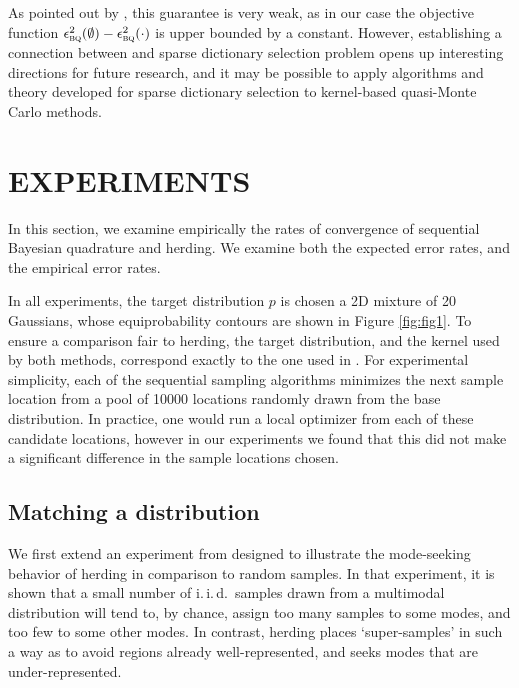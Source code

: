 \documentclass[]{article}
\begin{document}
As pointed out by \citet{KrauseCevher10}, this guarantee is very weak, as in our case the objective function $\epsilon^{2}_{{\textsc{bq}}{}}(\emptyset)-\epsilon^{2}_{{\textsc{bq}}{}}(\cdot)$ is upper bounded by a constant. However, establishing a connection between \sbq{} and sparse dictionary selection problem opens up interesting directions for future research, and it may be possible to apply algorithms and theory developed for sparse dictionary selection to kernel-based quasi-Monte Carlo methods.

\section{EXPERIMENTS}
\label{sec:experiments}

In this section, we examine empirically the rates of convergence of sequential Bayesian quadrature and herding.  We examine both the expected error rates, and the empirical error rates.

In all experiments, the target distribution $p$ is chosen a 2D mixture of 20 Gaussians, whose equiprobability contours are shown in Figure \ref{fig:fig1}. To ensure a comparison fair to herding, the target distribution, and the kernel used by both methods, correspond exactly to the one used in \citep[Fig. 1]{chen2010super}. %
%
For experimental simplicity, each of the sequential sampling algorithms minimizes the next sample location from a pool of 10000 locations randomly drawn from the base distribution. In practice, one would run a local optimizer from each of these candidate locations, however in our experiments we found that this did not make a significant difference in the sample locations chosen. 

\subsection{Matching a distribution}

We first extend an experiment from \citep{chen2010super} designed to illustrate the mode-seeking behavior of herding in comparison to random samples. In that experiment, %
it is shown that a small number of i.\,i.\,d.\ samples drawn from a multimodal distribution will tend to, by chance, assign too many samples to some modes, and too few to some other modes. In contrast, herding places `super-samples' in such a way as to avoid regions already well-represented, and seeks modes that are under-represented.
\end{document}
